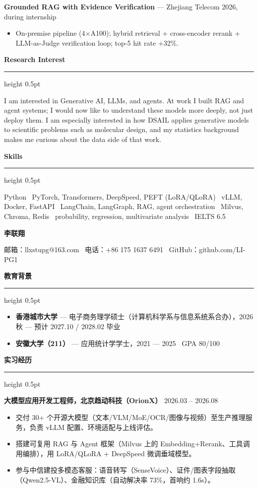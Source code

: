 \documentclass[10pt]{ctexart}
\newcommand{\sectionhead}[1]{%
  \needspace{3\baselineskip}%
  \vspace{6pt}%
  {\normalsize\bfseries #1}%
  \vspace{2pt}%
  \hrule height 0.5pt
  \vspace{3pt}%
}
\newcommand{\name}[1]{{\Large\bfseries #1}}
\begin{document}
\textbf{Grounded RAG with Evidence Verification} — Zhejiang Telecom \hfill 2026, during internship
\begin{itemize}
  \item On-premise pipeline (4$\times$A100); hybrid retrieval + cross-encoder rerank + LLM-as-Judge verification loop; top-5 hit rate +32\%.
\end{itemize}

\sectionhead{Research Interest}
I am interested in Generative AI, LLMs, and agents. At work I built RAG and agent systems; I would now like to understand these models more deeply, not just deploy them. I am especially interested in how DSAIL applies generative models to scientific problems such as molecular design, and my statistics background makes me curious about the data side of that work.

\sectionhead{Skills}
Python \textbar\ PyTorch, Transformers, DeepSpeed, PEFT (LoRA/QLoRA) \textbar\ vLLM, Docker, FastAPI \textbar\ LangChain, LangGraph, RAG, agent orchestration \textbar\ Milvus, Chroma, Redis \textbar\ probability, regression, multivariate analysis \textbar\ IELTS 6.5

\newpage

\fancyhead[R]{\small}

\begin{center}
  \name{李联翔}
\end{center}

\begin{center}
  邮箱：llxstupg@163.com \textbar\ 电话：+86 175 1637 6491 \textbar\ GitHub：github.com/LI-PG1
\end{center}

\sectionhead{教育背景}
\begin{itemize}
  \item \textbf{香港城市大学} — 电子商务理学硕士（计算机科学系与信息系统系合办），2026 秋 — 预计 2027.10 / 2028.02 毕业
  \item \textbf{安徽大学（211）} — 应用统计学学士，2021 — 2025 \textbar\ GPA 80/100
\end{itemize}

\sectionhead{实习经历}
\textbf{大模型应用开发工程师，北京趋动科技（OrionX）} \hfill 2026.03 -- 2026.08
\begin{itemize}
  \item 交付 30+ 个开源大模型（文本/VLM/MoE/OCR/图像与视频）至生产推理服务，负责 vLLM 配置、环境适配与上线评估。
  \item 搭建可复用 RAG 与 Agent 框架（Milvus 上的 Embedding+Rerank、工具调用编排），用 LoRA/QLoRA + DeepSpeed 微调垂域模型。
  \item 参与中信建投多模态客服：语音转写（SenseVoice）、证件/图表字段抽取（Qwen2.5-VL）、金融知识库（自动解决率 73\%，首响约 1.6s）。
\end{itemize}
\end{document}
